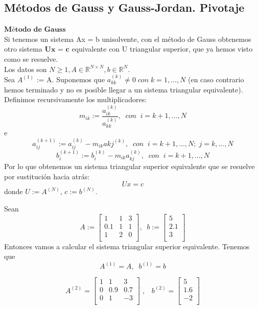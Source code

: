 		\subsection{Métodos de Gauss y Gauss-Jordan. Pivotaje}
		\begin{nlist}
		\item $\textbf{Método de Gauss}$\\
		Si tenemos un sistema Ax = b unisolvente, con el método de Gauss obtenemos otro sistema $\textbf{Ux = c}$ equivalente con U triangular superior, que ya hemos visto como se resuelve.\\
		Los datos son $N \geq 1, A \in \mathbb{R}^{N \times N}, b \in \mathbb{R}^N$.\\
		Sea $A^{(1)}$ := A. Suponemos que $a_{kk}^{(k)} \neq 0 \; con \; k = 1,...,N$ (en caso contrario hemos terminado y no es posible llegar a un sistema triangular equivalente). Definimos recursivamente los multiplicadores:
		\[ m_{ik} := \frac{a_{ik}^{(k)}}{a_{kk}^{(k)}}, \; \; con \; \; i = k+1,...,N \]
e
\[ a_{ij}^{(k+1)} := a_{ij}^{(k)} - m_{ik}a{kj}^{(k)}, \; \; con \; \; i = k+1,...,N; \; j = k,...,N \]
\[ b_i^{(k+1)} := b_i^{(k)} - m_{ik}a_{kj}^{(k)}, \; \; con \; \; i = k+1,...,N \]
Por lo que obtenemos un sistema triangular superior equivalente que se resuelve por sustitución hacia atrás:
\[ Ux = c \]
donde $U := A^{(N)}$, $c := b^{(N)}$.
			\begin{ejemplo}
			Sean
			\[ A := 
			\begin{bmatrix}
			1 & 1 & 3 \\
			0.1 & 1 & 1 \\
			1 & 2 & 0 \\
			\end{bmatrix}, \; \;
			b :=
			\begin{bmatrix}
			5 \\
			2.1 \\
			3 \\
			\end{bmatrix} \]
			Entonces vamos a calcular el sistema triangular superior equivalente.
			Tenemos que
			\[ A^{(1)} = A, \; \; b^{(1)} = b \]
			
			\[ A^{(2)} =
			\begin{bmatrix}
			1 & 1 & 3 \\
			0 & 0.9 & 0.7 \\
			0 & 1 & -3 \\
			\end{bmatrix} \; ,
			\; \; \;
			b^{(2)} =
			\begin{bmatrix}
			5 \\
			1.6 \\
			-2 \\
			\end{bmatrix} \]
			

\end{ejemplo}
\end{nlist}
